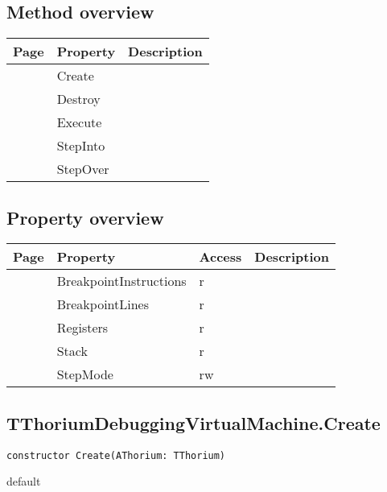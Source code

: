 \subsection{Method overview}
\label{thoriumcorepkg:thorium:tthoriumdebuggingvirtualmachine:methods}
\begin{tabularx}{\textwidth}{llX}
Page & Property & Description  \\ \hline
\pageref{thoriumcorepkg:thorium:tthoriumdebuggingvirtualmachine:create} & Create  &  \\
\pageref{thoriumcorepkg:thorium:tthoriumdebuggingvirtualmachine:destroy} & Destroy  &  \\
\pageref{thoriumcorepkg:thorium:tthoriumdebuggingvirtualmachine:execute} & Execute  &  \\
\pageref{thoriumcorepkg:thorium:tthoriumdebuggingvirtualmachine:stepinto} & StepInto  &  \\
\pageref{thoriumcorepkg:thorium:tthoriumdebuggingvirtualmachine:stepover} & StepOver  &  \\
\hline
\end{tabularx}
\subsection{Property overview}
\label{thoriumcorepkg:thorium:tthoriumdebuggingvirtualmachine:properties}
\begin{tabularx}{\textwidth}{lllX}
Page & Property & Access & Description \\ \hline
\pageref{thoriumcorepkg:thorium:tthoriumdebuggingvirtualmachine:breakpointinstructions} & BreakpointInstructions & r &  \\
\pageref{thoriumcorepkg:thorium:tthoriumdebuggingvirtualmachine:breakpointlines} & BreakpointLines & r &  \\
\pageref{thoriumcorepkg:thorium:tthoriumdebuggingvirtualmachine:registers} & Registers & r &  \\
\pageref{thoriumcorepkg:thorium:tthoriumdebuggingvirtualmachine:stack} & Stack & r &  \\
\pageref{thoriumcorepkg:thorium:tthoriumdebuggingvirtualmachine:stepmode} & StepMode & rw &  \\
\hline
\end{tabularx}
\subsection{TThoriumDebuggingVirtualMachine.Create}
\label{thoriumcorepkg:thorium:tthoriumdebuggingvirtualmachine:create}
\begin{FPCList}
\Declaration 

\begin{verbatim}
constructor Create(AThorium: TThorium)
\end{verbatim}
\Visibility
default
\end{FPCList}

